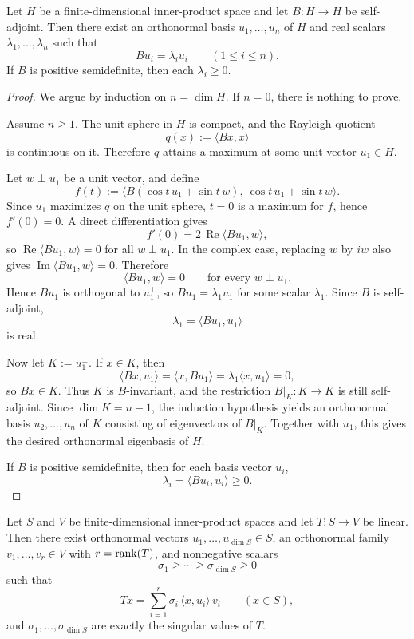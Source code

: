 \begin{lemma}
\label{lem:finite-selfadjoint-spectral-theorem}
Let \(H\) be a finite-dimensional inner-product space and let \(B:H\to H\) be
self-adjoint. Then there exist an orthonormal basis \(u_1,\dots,u_n\) of \(H\)
and real scalars \(\lambda_1,\dots,\lambda_n\) such that
\[
Bu_i=\lambda_i u_i
\qquad (1\le i\le n).
\]
If \(B\) is positive semidefinite, then each \(\lambda_i\ge 0\).
\end{lemma}

\begin{proof}
We argue by induction on \(n=\dim H\). If \(n=0\), there is nothing to prove.

Assume \(n\ge 1\). The unit sphere in \(H\) is compact, and the Rayleigh
quotient
\[
q(x):=\langle Bx,x\rangle
\]
is continuous on it. Therefore \(q\) attains a maximum at some unit vector
\(u_1\in H\).

Let \(w\perp u_1\) be a unit vector, and define
\[
f(t):=\bigl\langle B(\cos t\,u_1+\sin t\,w),\ \cos t\,u_1+\sin t\,w\bigr\rangle.
\]
Since \(u_1\) maximizes \(q\) on the unit sphere, \(t=0\) is a maximum for
\(f\), hence \(f'(0)=0\). A direct differentiation gives
\[
f'(0)=2\,\operatorname{Re}\langle Bu_1,w\rangle,
\]
so \(\operatorname{Re}\langle Bu_1,w\rangle=0\) for all \(w\perp u_1\). In the
complex case, replacing \(w\) by \(iw\) also gives
\(\operatorname{Im}\langle Bu_1,w\rangle=0\). Therefore
\[
\langle Bu_1,w\rangle=0
\qquad\text{for every }w\perp u_1.
\]
Hence \(Bu_1\) is orthogonal to \(u_1^\perp\), so \(Bu_1=\lambda_1 u_1\) for
some scalar \(\lambda_1\). Since \(B\) is self-adjoint,
\[
\lambda_1
=
\langle Bu_1,u_1\rangle
\]
is real.

Now let \(K:=u_1^\perp\). If \(x\in K\), then
\[
\langle Bx,u_1\rangle=\langle x,Bu_1\rangle=\lambda_1\langle x,u_1\rangle=0,
\]
so \(Bx\in K\). Thus \(K\) is \(B\)-invariant, and the restriction
\(B|_K:K\to K\) is still self-adjoint. Since \(\dim K=n-1\), the induction
hypothesis yields an orthonormal basis \(u_2,\dots,u_n\) of \(K\) consisting of
eigenvectors of \(B|_K\). Together with \(u_1\), this gives the desired
orthonormal eigenbasis of \(H\).

If \(B\) is positive semidefinite, then for each basis vector \(u_i\),
\[
\lambda_i=\langle Bu_i,u_i\rangle\ge 0.
\]
\end{proof}

\begin{lemma}
\label{lem:finite-singular-frame}
Let \(S\) and \(V\) be finite-dimensional inner-product spaces and let
\(T:S\to V\) be linear. Then there exist orthonormal vectors
\(u_1,\dots,u_{\dim S}\in S\), an orthonormal family
\(v_1,\dots,v_r\in V\) with \(r=\mathrm{rank}(T)\), and nonnegative scalars
\[
\sigma_1\ge \cdots \ge \sigma_{\dim S}\ge 0
\]
such that
\[
Tx=\sum_{i=1}^{r}\sigma_i\,\langle x,u_i\rangle\,v_i
\qquad (x\in S),
\]
and \(\sigma_1,\dots,\sigma_{\dim S}\) are exactly the singular values of
\(T\).
\end{lemma}


